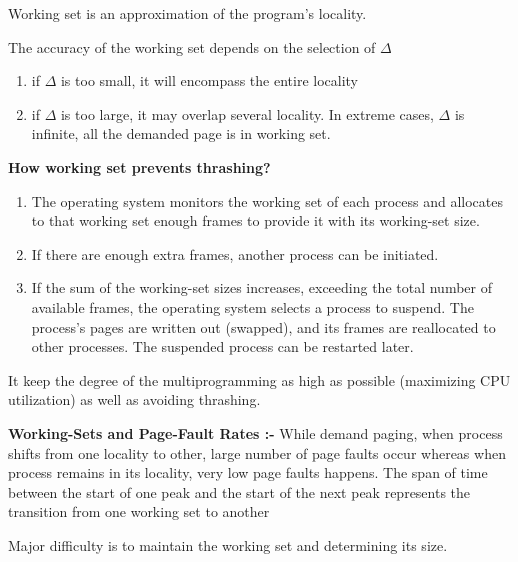 \documentclass[12pt,onecolumn]{IEEEtran}
\begin{document}
Working set is an approximation of the program's locality.
\vspace{3mm}

The accuracy of the working set depends on the selection of $\Delta$
\begin{enumerate}
	\item if $\Delta$ is too small, it will encompass the entire locality
	\item if $\Delta$ is too large, it may overlap several locality. In extreme cases, $\Delta$ is infinite, all the demanded page is in working set.
\end{enumerate}

\vspace{3mm}

\textbf{How working set prevents thrashing?}
\begin{enumerate}
	\item The operating system monitors the working set of each process and allocates to that working set enough frames to provide it with its working-set size.
	\item If there are enough extra frames, another process can be initiated.
	\item If the sum of the working-set sizes increases, exceeding the total number of available frames, the operating system selects a process to suspend. The process's pages are written out (swapped), and its frames are reallocated to other processes. The suspended process can be restarted later.
\end{enumerate}

It keep the degree of the multiprogramming as high as possible (maximizing CPU utilization) as well as avoiding thrashing. 

\vspace{3mm}

\textbf{Working-Sets and Page-Fault Rates :-} While demand paging, when process shifts from one locality to other, large number of page faults occur whereas when process remains in its locality, very low page faults happens. The span of time between the start
of one peak and the start of the next peak represents the transition from one
working set to another
\begin{center}
\end{center} 
Major difficulty is to maintain the working set and determining its size.
\end{document}
